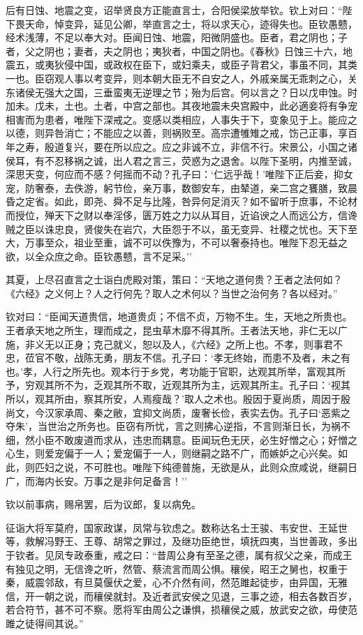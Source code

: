 \documentclass[]{article}
\begin{document}
后有日蚀、地震之变，诏举贤良方正能直言士，合阳侯梁放举钦。钦上对曰：``陛下畏天命，悼变异，延见公卿，举直言之士，将以求天心，迹得失也。臣钦愚戆，经术浅薄，不足以奉大对。臣闻日蚀、地震，阳微阴盛也。臣者，君之阴也；子者，父之阴也；妻者，夫之阴也；夷狄者，中国之阴也。《春秋》日蚀三十六，地震五，或夷狄侵中国，或政权在臣下，或妇乘夫，或臣子背君父，事虽不同，其类一也。臣窃观人事以考变异，则本朝大臣无不自安之人，外戚亲属无乖刺之心，关东诸侯无强大之国，三垂蛮夷无逆理之节；殆为后宫。何以言之？日以戊申蚀。时加未。戊未，土也。土者，中宫之部也。其夜地震未央宫殿中，此必適妾将有争宠相害而为患者，唯陛下深戒之。变感以类相应，人事失于下，变象见于上。能应之以德，则异咎消亡；不能应之以善，则祸败至。高宗遭雊雉之戒，饬己正事，享百年之寿，殷道复兴，要在所以应之。应之非诚不立，非信不行。宋景公，小国之诸侯耳，有不忍移祸之诚，出人君之言三，荧惑为之退舍。以陛下圣明，内推至诚，深思天变，何应而不感？何摇而不动？孔子曰：`仁远乎哉！'唯陛下正后妾，抑女宠，防奢泰，去佚游，躬节俭，亲万事，数御安车，由辇道，亲二宫之饔膳，致晨昏之定省。如此，即尧、舜不足与比隆，咎异何足消灭？如不留听于庶事，不论材而授位，殚天下之财以奉淫侈，匮万姓之力以从耳目，近谄谀之人而远公方，信谗贼之臣以诛忠良，贤俊失在岩穴，大臣怨于不以，虽无变异、社稷之忧也。天下至大，万事至众，祖业至重，诚不可以佚豫为，不可以奢泰持也。唯陛下忍无益之欲，以全众庶之命。臣钦愚戆，言不足采。''

其夏，上尽召直言之士诣白虎殿对策，策曰：``天地之道何贵？王者之法何如？《六经》之义何上？人之行何先？取人之术何以？当世之治何务？各以经对。''

钦对曰：``臣闻天道贵信，地道贵贞；不信不贞，万物不生。生，天地之所贵也。王者承天地之所生，理而成之，昆虫草木靡不得其所。王者法天地，非仁无以广施，非义无以正身；克己就义，恕以及人，《六经》之所上也。不孝，则事君不忠，莅官不敬，战陈无勇，朋友不信。孔子曰：`孝无终始，而患不及者，未之有也。'孝，人行之所先也。观本行于乡党，考功能于官职，达观其所举，富观其所予，穷观其所不为，乏观其所不取，近观其所为主，远观其所主。孔子曰：`视其所以，观其所由，察其所安，人焉瘦哉？'取人之术也。殷因于夏尚质，周因于殷尚文，今汉家承周、秦之敝，宜抑文尚质，废奢长俭，表实去伪。孔子曰`恶紫之夺朱'，当世治之所务也。臣窃有所忧，言之则拂心逆指，不言则渐日长，为祸不细，然小臣不敢废道而求从，违忠而耦意。臣闻玩色无厌，必生好憎之心；好憎之心生，则爱宠偏于一人；爱宠偏于一人，则继嗣之路不广，而嫉妒之心兴矣。如此，则匹妇之说，不可胜也。唯陛下纯德普施，无欲是从，此则众庶咸说，继嗣日广，而海内长安。万事之是非何足备言！''

钦以前事病，赐帛罢，后为议郎，复以病免。

征诣大将军莫府，国家政谋，凤常与钦虑之。数称达名士王骏、韦安世、王延世等，救解冯野王、王尊、胡常之罪过，及继功臣绝世，填抚四夷，当世善政，多出于钦者。见凤专政泰重，戒之曰：``昔周公身有至圣之德，属有叔父之亲，而成王有独见之明，无信谗之听，然管、蔡流言而周公惧。穰侯，昭王之舅也，权重于秦，威震邻敌，有旦莫偃伏之爱，心不介然有间，然范雎起徒步，由异国，无雅信，开一朝之说，而穰侯就封。及近者武安侯之见退，三事之迹，相去各数百岁，若合符节，甚不可不察。愿将军由周公之谦惧，损穰侯之威，放武安之欲，毋使范雎之徒得间其说。''
\end{document}
